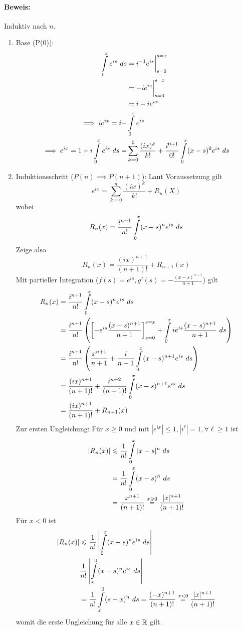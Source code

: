 \documentclass[11pt]{report}
\begin{document}
 \paragraph{Beweis:} Induktiv nach $n$.
 \begin{enumerate}
     \item Base (P(0)):
     \begin{align*}
         \int\displaylimits_0^xe^{is}\ ds&=i^{-1}e^{is}\bigg|_{s=0}^{s=x}\\
         &=-ie^{is}\bigg|_{s=0}^{s=x}\\
         &=i-ie^{ix} \\
         \implies ie^{ix}=i-&\int\displaylimits_0^xe^{is}\\
         \implies e^{ix}=1+i\int\displaylimits_0^xe^{is}\ ds=&\sum_{k=0}^0\dfrac{(ix)^k}{k!}+\dfrac{i^{0+1}}{0!}\int\displaylimits_0^x(x-s)^0e^{is}\ ds
     \end{align*}
     \item Induktionsschritt ($P(n)\implies P(n+1)$): Laut Voraussetzung gilt 
     $$e^{ix}=\sum_{k=0}^n\dfrac{(ix)^k}{k!}+R_n(X)$$
     wobei 
     $$R_n(x)=\dfrac{i^{n+1}}{n!}\int\displaylimits_0^x(x-s)^ne^{is}\ ds$$
     Zeige also 
     $$R_n(x)=\dfrac{(ix)^{n+1}}{(n+1)!}+R_{n+1}(x)$$
     Mit partieller Integration ($f(s)=e^{is}, g'(s)=-\frac{(x-s)^{n+1}}{n+1}$) gilt
     \begin{align*}
         R_n(x)&=\dfrac{i^{n+1}}{n!}\int\displaylimits_0^x(x-s)^ne^{is}\ ds \\
         &=\dfrac{i^{n+1}}{n!}\left(\left[-e^{is}\dfrac{(x-s)^{n+1}}{n+1}\right]_{s=0}^{s=x}+\int\displaylimits_0^xie^{is}\dfrac{(x-s)^{n+1}}{n+1}\ ds\right)\\ 
         &=\dfrac{i^{n+1}}{n!}\left(\dfrac{x^{n+1}}{n+1}+\dfrac{i}{n+1}\int\displaylimits_0^x(x-s)^{n+1}e^{is}\ ds \right) \\
         &=\dfrac{(ix)^{n+1}}{(n+1)!}+\dfrac{i^{n+2}}{(n+1)!}\int\displaylimits_0^x(x-s)^{n+1}e^{is}\ ds\\
         &=\dfrac{(ix)^{n+1}}{(n+1)!}+R_{n+1}(x)
     \end{align*}
     Zur ersten Ungleichung: \newline
     F\"ur $x\geq0$ und mit $|e^{ix}|\leq1, |i^\ell|=1,\forall\ell\geq1$ ist
     \begin{align*}
         |R_n(x)|&\leq\dfrac{1}{n!}\int\displaylimits_0^x|x-s|^n\ ds\\
         &=\dfrac{1}{n!}\int\displaylimits_0^x(x-s)^n\ ds \\
         &=\dfrac{x^{n+1}}{(n+1)!}\overset{x\geq0}{=}\dfrac{|x|^{n+1}}{(n+1)!}
     \end{align*}
     F\"ur $x<0$ ist
     \begin{align*}
         |R_n(x)|&\leq\dfrac{1}{n!}\left|\int\displaylimits_0^x(x-s)^ne^{is}\ ds\right|\\
         &\dfrac{1}{n!}\left|\int\displaylimits_x^0(x-s)^ne^{is}\ ds\right| \\
         &=\dfrac{1}{n!}\int\displaylimits_x^0(s-x)^n\ ds =\dfrac{(-x)^{n+1}}{(n+1)!}\overset{x<0}{=}\dfrac{|x|^{n+1}}{(n+1)!}
     \end{align*}
     womit die erste Ungleichung f\"ur alle $x\in\mathbb{R}$ gilt.
 \end{enumerate}
\end{document}
